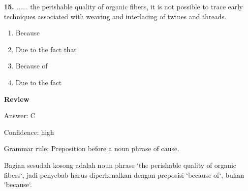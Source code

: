 \documentclass[12pt]{article}
\begin{document}
\noindent\textbf{15.} ...... the perishable quality of organic fibers, it is not possible to trace early techniques associated with weaving and interlacing of twines and threads.
\begin{enumerate}[label=(\Alph*),leftmargin=*,itemsep=0.2em]
\item Because
\item Due to the fact that
\item Because of
\item Due to the fact
\end{enumerate}
\par
\begingroup
\setlength{\parskip}{0pt}
\setlength{\parindent}{0pt}
\textbf{Review}\par
Answer: C\par
Confidence: high\par
Grammar rule: Preposition before a noun phrase of cause.\par
Bagian sesudah kosong adalah noun phrase `the perishable quality of organic fibers`, jadi penyebab harus diperkenalkan dengan preposisi `because of`, bukan `because`.\par
\endgroup
\par
\vspace{0.25\baselineskip}
\end{document}
